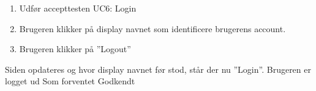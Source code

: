 
		{
		\begin{enumerate}
			\item Udfør accepttesten UC6: Login
			\item Brugeren klikker på display navnet som identificere brugerens account.
			\item Brugeren klikker på ''Logout''
		\end{enumerate}
		} %
		{Siden opdateres og hvor display navnet før stod, står der nu ''Login''. Brugeren er logget ud} %
		{Som forventet} %
		{Godkendt} %


